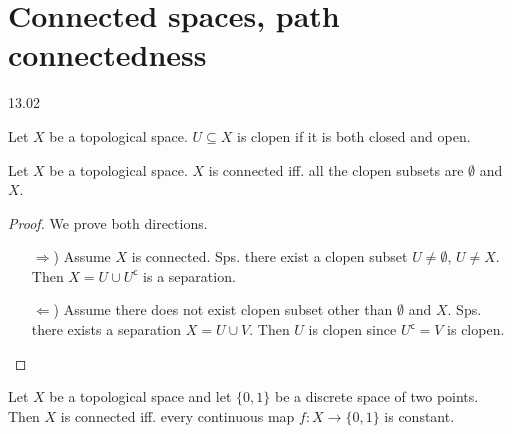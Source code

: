 \section{Connected spaces, path connectedness}
13.02

\begin{definition}[clopen]
   Let \( X \) be a topological space.
   \( U \subseteq X \) is clopen if it is both closed and  open.
\end{definition}

\begin{proposition}
   Let \( X \) be a topological space.
   \( X \) is connected iff. all the clopen subsets  are \( \emptyset \) and \( X \).
\end{proposition}

\begin{proof}
   We prove both directions.
   \begin{enumerate}
     \item[\( \Rightarrow \))]
       Assume \( X \) is connected.
       Sps. there exist a clopen subset \( U \neq \emptyset \), \( U \neq X \).
       Then \( X = U \cup U^\mathsf{c} \) is a separation.
     \item[\( \Leftarrow \))]
       Assume there does not exist clopen subset other than \( \emptyset \)
       and \( X \).
       Sps. there exists a separation \( X = U \cup V \).
       Then \( U \) is clopen since \( U^\mathsf{c} = V \)
       is clopen.
   \end{enumerate}
\end{proof}

\begin{proposition}
  Let \( X \) be a topological space and
  let \( \{0, 1\} \) be a discrete space of two points.
  Then \( X \) is connected iff. every continuous map 
  \( f: X \to \{0, 1\} \) is constant.
\end{proposition}

